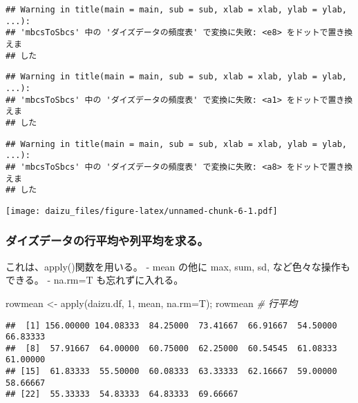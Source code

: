 \documentclass[
]{article}
\newenvironment{Shaded}{\begin{snugshade}}{\end{snugshade}}
\newcommand{\AttributeTok}[1]{\textcolor[rgb]{0.77,0.63,0.00}{#1}}
\newcommand{\CommentTok}[1]{\textcolor[rgb]{0.56,0.35,0.01}{\textit{#1}}}
\newcommand{\DecValTok}[1]{\textcolor[rgb]{0.00,0.00,0.81}{#1}}
\newcommand{\FunctionTok}[1]{\textcolor[rgb]{0.00,0.00,0.00}{#1}}
\newcommand{\NormalTok}[1]{#1}
\newcommand{\OtherTok}[1]{\textcolor[rgb]{0.56,0.35,0.01}{#1}}
\begin{document}
\begin{verbatim}
## Warning in title(main = main, sub = sub, xlab = xlab, ylab = ylab, ...):
## 'mbcsToSbcs' 中の 'ダイズデータの頻度表' で変換に失敗: <e8> をドットで置き換えま
## した
\end{verbatim}

\begin{verbatim}
## Warning in title(main = main, sub = sub, xlab = xlab, ylab = ylab, ...):
## 'mbcsToSbcs' 中の 'ダイズデータの頻度表' で変換に失敗: <a1> をドットで置き換えま
## した
\end{verbatim}

\begin{verbatim}
## Warning in title(main = main, sub = sub, xlab = xlab, ylab = ylab, ...):
## 'mbcsToSbcs' 中の 'ダイズデータの頻度表' で変換に失敗: <a8> をドットで置き換えま
## した
\end{verbatim}

\texttt{[image: daizu\_files/figure-latex/unnamed-chunk-6-1.pdf]}

\hypertarget{ux30c0ux30a4ux30baux30c7ux30fcux30bfux306eux884cux5e73ux5747ux3084ux5217ux5e73ux5747ux3092ux6c42ux308b}{%
\subsubsection{ダイズデータの行平均や列平均を求る。}\label{ux30c0ux30a4ux30baux30c7ux30fcux30bfux306eux884cux5e73ux5747ux3084ux5217ux5e73ux5747ux3092ux6c42ux308b}}

これは、apply()関数を用いる。 - mean の他に max, sum, sd,
など色々な操作もできる。 - na.rm=T も忘れずに入れる。

\begin{Shaded}
\begin{Highlighting}[]
\NormalTok{    rowmean }\OtherTok{\textless{}{-}} \FunctionTok{apply}\NormalTok{(daizu.df, }\DecValTok{1}\NormalTok{, mean, }\AttributeTok{na.rm=}\NormalTok{T); rowmean       }\CommentTok{\# 行平均}
\end{Highlighting}
\end{Shaded}

\begin{verbatim}
##  [1] 156.00000 104.08333  84.25000  73.41667  66.91667  54.50000  66.83333
##  [8]  57.91667  64.00000  60.75000  62.25000  60.54545  61.08333  61.00000
## [15]  61.83333  55.50000  60.08333  63.33333  62.16667  59.00000  58.66667
## [22]  55.33333  54.83333  64.83333  69.66667
\end{verbatim}
\end{document}

